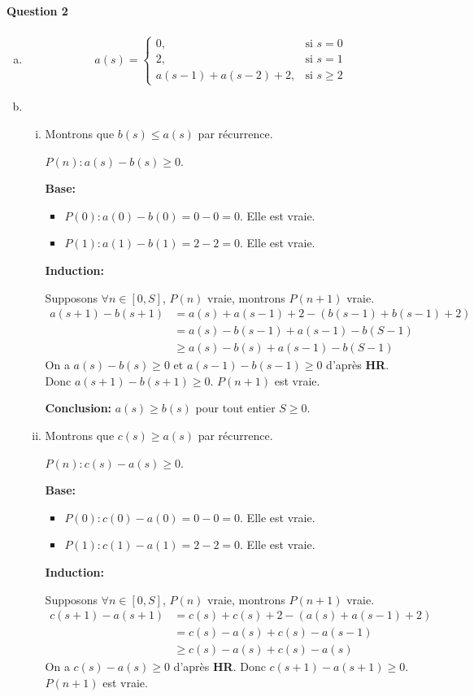 \documentclass{article}
\begin{document}
\paragraph{Question 2}
\begin{enumerate}[a)]
\item \begin{align*}
 a(s)=
\begin{cases}
0,&\text{si } s=0\\
2,&\text{si } s=1\\
a(s-1)+a(s-2)+2,&\text{si } s\geq 2
\end{cases}
\end{align*}
\item 
\begin{enumerate}[i. ]
\item Montrons que $b(s) \leq a(s)$ par récurrence.

$P(n):  a(s) - b(s) \geq 0 $.


\textbf{Base: } 
\begin{itemize}
\item $P(0): a(0) - b(0) = 0 - 0 = 0$. Elle est vraie. 
\item $P(1): a(1) - b(1) = 2 - 2 = 0$. Elle est vraie.
\end{itemize}
\textbf{Induction: } 

Supposons $\forall n \in [0,S]$, $P(n)$ vraie, montrons $P(n+1)$ vraie.
\begin{align*}
a(s+1) - b(s+1) &= a(s) + a(s-1) + 2 - (b(s-1) + b(s-1) +2)
			\\&= a(s) - b(s-1) + a(s-1) - b(S-1)
			\\&\geq a(s) - b(s) + a(s-1) - b(S-1)
\end{align*}
On a $a(s) - b(s) \geq 0$ et $a(s-1) - b(s-1) \geq 0$ d'après \textbf{HR}. Donc $a(s+1) - b(s+1) \geq 0$. $P(n+1)$ est vraie.

\textbf{Conclusion: }$a(s) \geq b(s)$ pour tout entier $S\geq0$. 
\item Montrons que $c(s) \geq a(s)$ par récurrence.

$P(n):  c(s) - a(s) \geq 0 $.

\textbf{Base: } 
\begin{itemize}
\item $P(0): c(0) - a(0) = 0 - 0 = 0$. Elle est vraie. 
\item $P(1): c(1) - a(1) = 2 - 2 = 0$. Elle est vraie.
\end{itemize}
\textbf{Induction: } 

Supposons $\forall n \in [0,S]$, $P(n)$ vraie, montrons $P(n+1)$ vraie.
\begin{align*}
c(s+1) - a(s+1) &= c(s) + c(s) + 2 - (a(s) + a(s-1) +2)
			\\&= c(s) - a(s) + c(s) - a(s-1)
			\\&\geq c(s) - a(s) + c(s) - a(s)
\end{align*}
On a $c(s) - a(s) \geq 0$ d'après \textbf{HR}. Donc $c(s+1) - a(s+1) \geq 0$. $P(n+1)$ est vraie.


\end{enumerate}
\end{enumerate}
\end{document}
